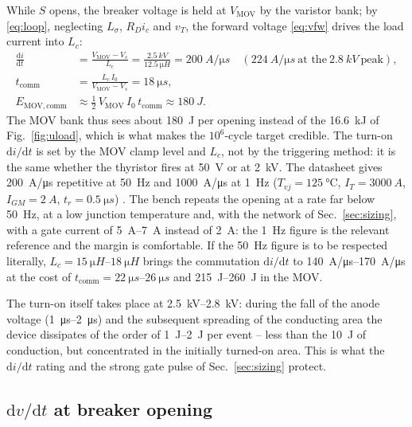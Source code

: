 \documentclass[11pt,a4paper]{article}
\begin{document}
While $S$ opens, the breaker voltage is held at $V_{\mathrm{MOV}}$ by the varistor bank; by
\eqref{eq:loop}, neglecting $L_\sigma$, $R_D i_c$ and $v_T$, the forward voltage \eqref{eq:vfw}
drives the load current into $L_c$:
\begin{align}
  \frac{\mathrm{d}i}{\mathrm{d}t} &= \frac{V_{\mathrm{MOV}} - V_s}{L_c}
      = \frac{\SI{2.5}{kV}}{\SI{12.5}{\micro H}} = \SI{200}{A/\micro s}
      \quad (\SI{224}{A/\micro s}\ \text{at the}\ \SI{2.8}{kV}\ \text{peak}), \\
  t_{\mathrm{comm}} &= \frac{L_c\,I_0}{V_{\mathrm{MOV}} - V_s} = \SI{18}{\micro s}, \\
  E_{\mathrm{MOV,comm}} &\approx \tfrac12\,V_{\mathrm{MOV}}\,I_0\,t_{\mathrm{comm}} \approx \SI{180}{J}.
\end{align}
The MOV bank thus sees about \SI{180}{J} per opening instead of the \SI{16.6}{kJ} of
Fig.~\ref{fig:uload}, which is what makes the $10^6$-cycle target credible.
The turn-on $\mathrm{d}i/\mathrm{d}t$ is set by the MOV clamp level and $L_c$, not by the
triggering method: it is the same whether the thyristor fires at \SI{50}{V} or at \SI{2}{kV}.
The datasheet gives \SI{200}{A/\micro s} repetitive at \SI{50}{Hz} and \SI{1000}{A/\micro s} at
\SI{1}{Hz} ($T_{vj} = \SI{125}{\celsius}$, $I_T = \SI{3000}{A}$, $I_{GM} = \SI{2}{A}$,
$t_r = \SI{0.5}{\micro s}$) \cite{ds26n6500}. The bench repeats the opening at a rate far below
\SI{50}{Hz}, at a low junction temperature and, with the network of Sec.~\ref{sec:sizing}, with
a gate current of \SIrange{5}{7}{A} instead of \SI{2}{A}: the \SI{1}{Hz} figure is the relevant
reference and the margin is comfortable. If the \SI{50}{Hz} figure is to be respected literally,
$L_c = \SIrange{15}{18}{\micro H}$ brings the commutation $\mathrm{d}i/\mathrm{d}t$ to
\SIrange{140}{170}{A/\micro s} at the cost of $t_{\mathrm{comm}} = \SIrange{22}{26}{\micro s}$
and \SIrange{215}{260}{J} in the MOV.

The turn-on itself takes place at \SIrange{2.5}{2.8}{kV}: during the fall of the anode voltage
(\SIrange{1}{2}{\micro s}) and the subsequent spreading of the conducting area the device
dissipates of the order of \SIrange{1}{2}{J} per event -- less than the \SI{10}{J} of conduction,
but concentrated in the initially turned-on area. This is what the $\mathrm{d}i/\mathrm{d}t$
rating and the strong gate pulse of Sec.~\ref{sec:sizing} protect.

\subsection{$\mathrm{d}v/\mathrm{d}t$ at breaker opening}
\label{sec:dvdt}
\end{document}
